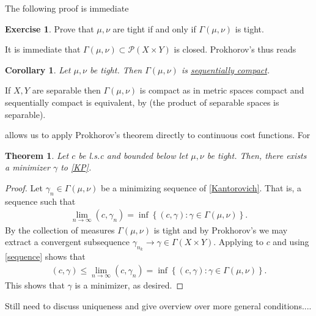 \documentclass[
    a4paper,
    DIV=14,
    abstract=true,
    numbers=noenddot
]
{scrartcl}
\newtheorem{theorem}{Theorem}[section]
\newtheorem{corollary}[corollary]{Corollary}
\theoremstyle{definition}
\newtheorem{exercise}{Exercise}
\newcommand{\set}[1]{\left\{#1\right\}}
\newcommand{\Pp}{\mathcal{P}}
\begin{document}
The following proof is immediate
\begin{exercise}\label{tightness equiv}
    Prove that $\mu ,\nu$ are tight if and only if $\Gamma(\mu ,\nu )$ is tight.
\end{exercise}
It is immediate that $\Gamma (\mu , \nu ) \subset \Pp (X\times Y)$ is closed. Prokhorov's  thus reads
\begin{corollary}\label{compactness}\label{prokorov corollary}
    Let $ \mu , \nu $ be tight. Then $\Gamma (\mu , \nu )$ is \href{https://en.wikipedia.org/wiki/Sequentially_compact_space}{sequentially compact}.
\end{corollary}

If $X,Y$ are separable then $\Gamma (\mu ,\nu )$ is compact as in metric spaces compact and sequentially compact is equivalent, by  (the product of separable spaces is separable).


 allows us to apply Prokhorov's theorem directly to continuous cost functions. For
\begin{theorem}\label{existence theorem}
    Let $c$ be l.s.c and bounded below let $\mu , \nu $ be tight. Then, there exists a minimizer $\gamma $ to \eqref{KP}.
\end{theorem}
\begin{proof}
    Let $\gamma _n \in \Gamma (\mu ,\nu)$ be a minimizing sequence of \eqref{Kantorovich}. That is, a sequence such that
    \begin{align}\label{sequence}
        \lim_{n \to \infty} (c,\gamma_n) = \inf\set{(c,\gamma) : \gamma \in  \Gamma (\mu ,\nu ) }.
    \end{align}
    By  the collection of measures $\Gamma(\mu ,\nu )$ is tight and by Prokhorov's   we may extract a convergent subsequence $\gamma_{n_k} \to \gamma \in \Gamma (X\times Y)$. Applying  to $c$ and using \eqref{sequence} shows that
    \begin{align*}
        (c, \gamma ) \leq \lim_{n \to \infty}(c,\gamma_n)=\inf\set{(c,\gamma) : \gamma \in  \Gamma (\mu ,\nu ) }.
    \end{align*}
    This shows that $\gamma $ is a minimizer, as desired.
\end{proof}
Still need to discuss uniqueness and give overview over more general conditions....
\end{document}
